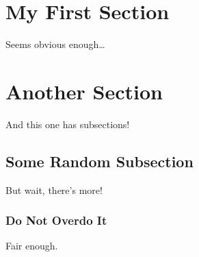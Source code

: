 \documentclass[a4paper,12pt]{article}
\begin{document}
\section{My First Section}
    Seems obvious enough\ldots
\section{Another Section}
    And this one has subsections!
    \subsection{Some Random Subsection}
        But wait, there's more!
        \subsubsection{Do Not Overdo It}
            Fair enough.
\end{document}
